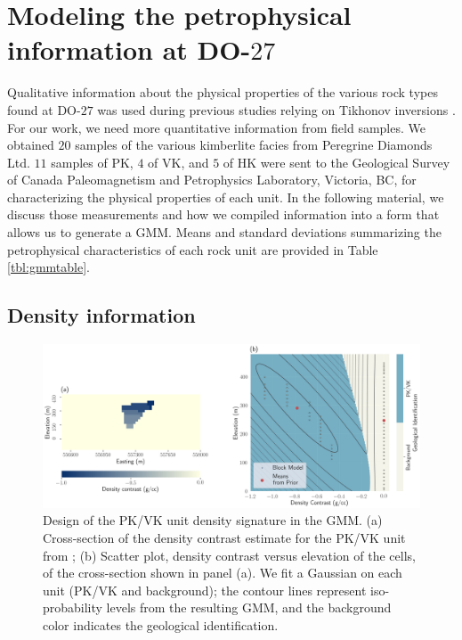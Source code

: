 \documentclass[paper, twocolumn]{geophysics} %
\begin{document}
\section{Modeling the petrophysical information at DO-$27$}

Qualitative information about the physical properties of the various rock types found at DO-$27$ was used during previous studies relying on Tikhonov inversions \citep{TKCpaper,TKCEM,TKCIP}. For our work, we need more quantitative information from field samples. We obtained $20$ samples of the various kimberlite facies from Peregrine Diamonds Ltd. $11$ samples of PK, $4$ of VK, and $5$ of HK were sent to the Geological Survey of Canada Paleomagnetism and Petrophysics Laboratory, Victoria, BC, for characterizing the physical properties of each unit. In the following material, we discuss those measurements and how we compiled information into a form that allows us to generate a GMM. Means and standard deviations summarizing the petrophysical characteristics of each rock unit are provided in Table \ref{tbl:gmmtable}.

\subsection{Density information}
\label{pkvkdensitysection}

\begin{figure}%
\centering
\includegraphics[width=\textwidth]{Figures/300dpi/Figure7.png}
\caption{Design of the PK/VK unit density signature in the GMM. (a) Cross-section of the density contrast estimate for the PK/VK unit from \citet{TechnicalReport}; (b) Scatter plot, density contrast versus elevation of the cells, of the cross-section shown in panel (a). We fit a Gaussian on each unit (PK/VK and background); the contour lines represent iso-probability levels from the resulting GMM, and the background color indicates the geological identification.}
\label{fig:Figure7.png}
\end{figure}%
\end{document}
